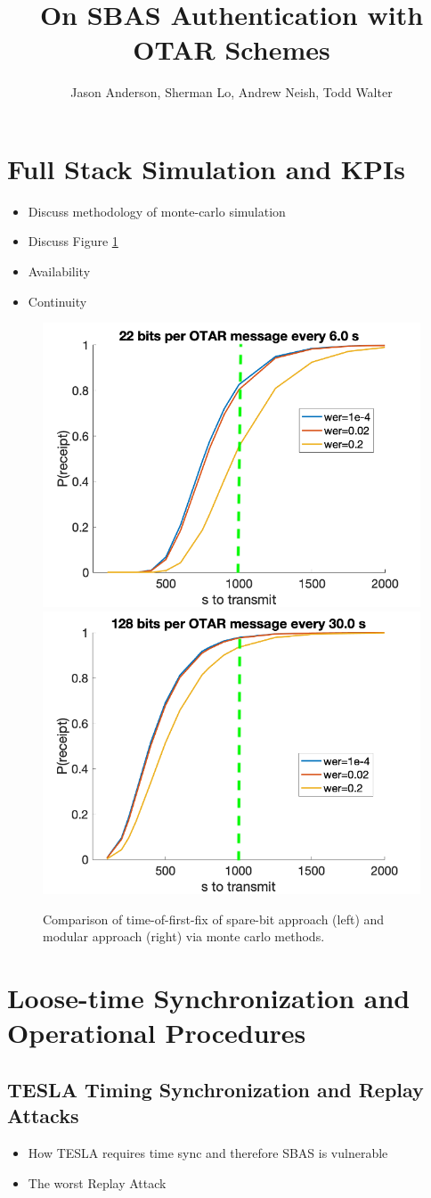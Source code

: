 \documentclass[letterpaper,times]{IONconf/IONconf}
\title{On SBAS Authentication with OTAR Schemes}
\author{Jason Anderson, Sherman Lo, Andrew Neish, Todd Walter}
\begin{document}
\maketitle

\section{Full Stack Simulation and KPIs}

\begin{itemize}
	\item Discuss methodology of monte-carlo simulation
	\item Discuss Figure \ref{fig:time-of-first-fix-mc}
	\item Availability
	\item Continuity
\end{itemize}

\begin{figure}[H]
	\centering
	\includegraphics[width=0.4\linewidth]{fig/integrated_mc.png}
	\includegraphics[width=0.4\linewidth]{fig/modular_mc.png}
	\caption{Comparison of time-of-first-fix of spare-bit approach (left) and modular approach (right) via monte carlo methods.}
	\label{fig:time-of-first-fix-mc}
\end{figure}

\section{Loose-time Synchronization and Operational Procedures}

\subsection{TESLA Timing Synchronization and Replay Attacks}
\begin{itemize}
	\item How TESLA requires time sync and therefore SBAS is vulnerable
	\item The worst Replay Attack
\end{itemize}
\end{document}
